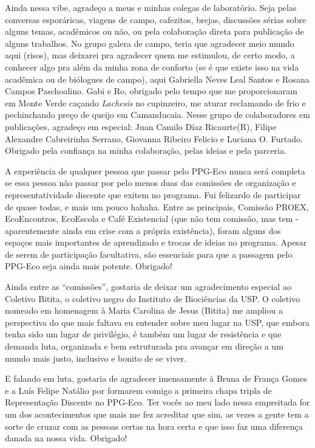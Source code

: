 \documentclass[12pt,openright,oneside,a4paper,english]{abntex2}
\begin{document}
\begin{agradecimentos}[Agradecimentos]
Ainda nessa vibe, agradeço a meus e minhas colegas de laboratório. Seja pelas conversas esporáricas, viagens de campo, cafezitos, brejas, discussões sérias sobre alguns temas, acadêmicos ou não, ou pela colaboração direta para publicação de alguns trabalhos. No grupo galera de campo, teria que agradecer meio mundo aqui (risos), mas deixarei pra agradecer quem me estimulou, de certo modo, a conhecer algo pra além da minha zona de conforto (se é que existe isso na vida acadêmica ou de biólogues de campo), aqui Gabriella Neves Leal Santos e Rosana Campos Paschoalino. Gabi e Ro, obrigado pelo tempo que me proporcionaram em Monte Verde caçando \textit{Lachesis} no cupinzeiro, me aturar reclamando de frio e pechinchando preço de queijo em Camanducaia. Nesse grupo de colaboradores em publicações, agradeço em especial: Juan Camilo Díaz Ricaurte(R), Filipe Alexandre Cabreirinha Serrano, Giovanna Ribeiro Felicio e Luciana O. Furtado. Obrigado pela confiança na minha colaboração, pelas ideias e pela parceria.

A experiência de qualquer pessoa que passar pelo PPG-Eco nunca será completa se essa pessoa não passar por pelo menos duas das comissões de organização e representatividade discente que exitem no programa. Fui felizardo de participar de quase todas, e mais um pouco hahaha. Entre as principais, Comissão PROEX, EcoEncontros, EcoEscola e Café Existencial (que não tem comissão, mas tem - aparentemente ainda em crise com a própria existência), foram alguns dos espaços mais importantes de aprendizado e trocas de ideias no programa. Apesar de serem de participação facultativa, são essenciais para que a passagem pelo PPG-Eco seja ainda mais potente. Obrigado! 

Ainda entre as “comissões”, gostaria de deixar um agradecimento especial ao Coletivo Bitita, o coletivo negro do Instituto de Biociências da USP. O coletivo nomeado em homenagem à Maria Carolina de Jesus (Bitita) me ampliou a perspectiva do que mais faltava eu entender sobre meu lugar na USP, que embora tenha sido um lugar de privilégio, é também um lugar de resistência e que demanda luta, organizada e bem estruturada pra avançar em direção a um mundo mais justo, inclusivo e bonito de se viver.

E falando em luta, gostaria de agradecer imensamente à Bruna de França Gomes e a Luís Felipe Natálio por formarem comigo a primeira chapa tripla de Representação Discente no PPG-Eco. Ter vocês ao meu lado nessa empreitada for um dos acontecimentos que mais me fez acreditar que sim, as vezes a gente tem a sorte de cruzar com as pessoas certas na hora certa e que isso faz uma diferença danada na nossa vida. Obrigado!


\end{agradecimentos}
\end{document}

